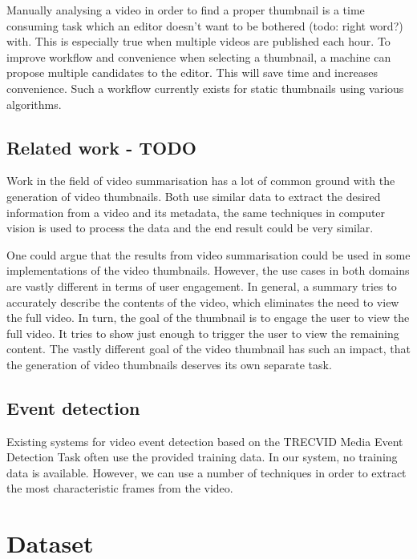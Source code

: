 \documentclass{../resources/acm_proc_article-sp}
\begin{document}

Manually analysing a video in order to find a proper thumbnail is a time consuming task which an editor doesn't want to be bothered (todo: right word?) with. This is especially true when multiple videos are published each hour. To improve workflow and convenience when selecting a thumbnail, a machine can propose multiple candidates to the editor. This will save time and increases convenience. Such a workflow currently exists for static thumbnails using various algorithms.


\subsection{Related work - TODO}

Work in the field of video summarisation has a lot of common ground with the generation of video thumbnails. Both use similar data to extract the desired information from a video and its metadata, the same techniques in computer vision is used to process the data and the end result could be very similar. 

One could argue that the results from video summarisation could be used in some implementations of the video thumbnails. However, the use cases in both domains are vastly different in terms of user engagement. In general, a summary tries to accurately describe the contents of the video, which eliminates the need to view the full video. In turn, the goal of the thumbnail is to engage the user to view the full video. It tries to show just enough to trigger the user to view the remaining content. The vastly different goal of the video thumbnail has such an impact, that the generation of video thumbnails deserves its own separate task.


\subsection{Event detection}

Existing systems for video event detection based on the TRECVID Media Event Detection Task often use the provided training data. In our system, no training data is available. However, we can use a number of techniques in order to extract the most characteristic frames from the video.

\section{Dataset}
\end{document}
